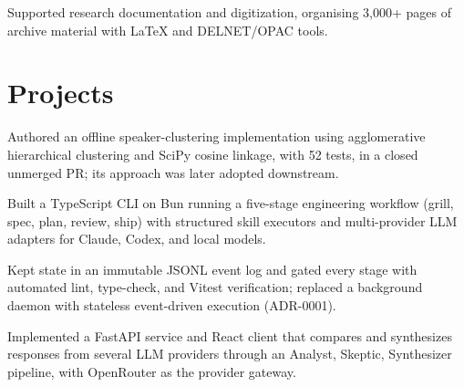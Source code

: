 \documentclass{../../../templates/1/resume}
\begin{document}
\begin{resumeitemize}
\item Supported research documentation and digitization, organising 3{,}000+ pages of archive material with LaTeX and DELNET/OPAC tools.
\end{resumeitemize}

\section{Projects}

\begin{resumeitemize}
\item Authored an offline speaker-clustering implementation using agglomerative hierarchical clustering and SciPy cosine linkage, with 52 tests, in a closed unmerged PR; its approach was later adopted downstream.
\end{resumeitemize}

\begin{resumeitemize}
\item Built a TypeScript CLI on Bun running a five-stage engineering workflow (grill, spec, plan, review, ship) with structured skill executors and multi-provider LLM adapters for Claude, Codex, and local models.
\item Kept state in an immutable JSONL event log and gated every stage with automated lint, type-check, and Vitest verification; replaced a background daemon with stateless event-driven execution (ADR-0001).
\end{resumeitemize}

\begin{resumeitemize}
\item Implemented a FastAPI service and React client that compares and synthesizes responses from several LLM providers through an Analyst, Skeptic, Synthesizer pipeline, with OpenRouter as the provider gateway.
\end{resumeitemize}
\end{document}
